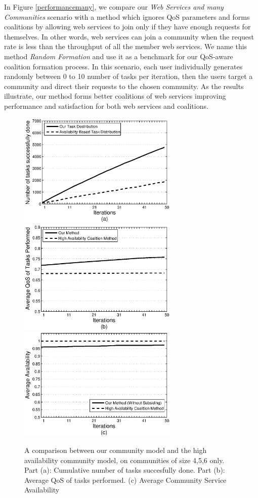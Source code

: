 \documentclass[10pt,journal,cspaper,compsoc]{IEEEtran}
\begin{document}
In Figure \ref{performancemany}, we compare our \emph{Web Services
and many Communities} scenario with a method which ignores QoS
parameters and forms coalitions by allowing web services to join
only if they have enough requests for themselves. In other words,
web services can join a community when the request rate is less
than the throughput of all the member web services. We name this
method \emph{Random Formation} and use it as a benchmark for our
QoS-aware coalition formation process. In this scenario, each user individually generates randomly 
between 0 to 10 number of tasks per iteration, then the users target a community and direct their requests to the chosen community. As the results illustrate,
our method forms better coalitions of web services improving
performance and satisfaction for both web services and coalitions.

\begin{figure}[!t]
\centering
\includegraphics[width=3in]{avg_task_ws_done.eps}
\includegraphics[width=3in]{avg_qos_ws_done.eps}
\includegraphics[width=3in]{avg_avail_ws_done.eps}
\caption{A comparison between our community model and the high availability community model, on communities of size 4,5,6 only. Part (a): Cumulative number of tasks succesfully done. Part
(b): Average QoS of tasks performed. (c) Average Community Service Availability} \label{fig_avail_method}
\end{figure}
\end{document}
